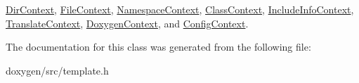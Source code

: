 \mbox{\hyperlink{class_dir_context_aa32fa4e75b13432c9dc8d42d5e8d6cad}{Dir\+Context}}, \mbox{\hyperlink{class_file_context_a76d76875d88990fae2a58b92e4fd97e0}{File\+Context}}, \mbox{\hyperlink{class_namespace_context_ab7009613a99e733dd82347c46963808c}{Namespace\+Context}}, \mbox{\hyperlink{class_class_context_a0be571acb1fbb5bf559fda7daad05a36}{Class\+Context}}, \mbox{\hyperlink{class_include_info_context_a85637ec320e16700349765ab31878ded}{Include\+Info\+Context}}, \mbox{\hyperlink{class_translate_context_a1fa557ada4404a339cae9d011074a56b}{Translate\+Context}}, \mbox{\hyperlink{class_doxygen_context_a6121205533d3518b8add76e569f80d10}{Doxygen\+Context}}, and \mbox{\hyperlink{class_config_context_a56eb8523197fa488cb099b47808b7ba7}{Config\+Context}}.



The documentation for this class was generated from the following file\+:\begin{DoxyCompactItemize}
\item 
doxygen/src/template.\+h\end{DoxyCompactItemize}
